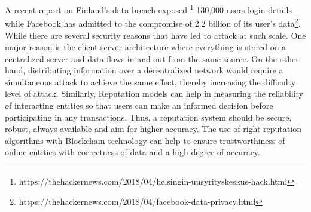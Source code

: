 A recent report on Finland's data breach exposed
\footnote{https://thehackernews.com/2018/04/helsingin-uusyrityskeskus-hack.html}
130,000 users login details while Facebook has admitted to the compromise of
2.2 billion of its user's
data\footnote{https://thehackernews.com/2018/04/facebook-data-privacy.html}.
While there are several security reasons that have led to attack at such scale.
One major reason is the client-server architecture where everything is stored
on a centralized server and data flows in and out from the same source. On the
other hand, distributing information over a decentralized network would require
a simultaneous attack to achieve the same effect, thereby increasing the
difficulty level of attack. Similarly, Reputation models can help in measuring
the reliability of interacting entities so that users can make an informed
decision before participating in any transactions. Thus, a reputation system
should be secure, robust, always available and aim for higher accuracy. The use
of right reputation algorithms with Blockchain technology can help to ensure
trustworthiness of online entities with correctness of data and a high degree
of accuracy.  


